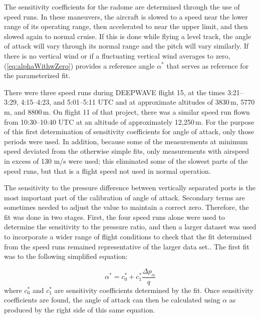 \documentclass[12pt,twoside,english]{article}\usepackage[]{graphicx}\usepackage[]{color}
\newenvironment{lyxcode}
{\par\begin{list}{}{
\setlength{\rightmargin}{\leftmargin}
\setlength{\listparindent}{0pt}%
\raggedright
\setlength{\itemsep}{0pt}
\setlength{\parsep}{0pt}
\normalfont\ttfamily}%
 \item[]}
{\end{list}}
\let\OrgIndex\index
\renewcommand*{\index}[1]{\OrgIndex{#1}}
\begin{document}
{{The sensitivity coefficients for the radome are determined through the use of speed runs. In these maneuvers, the aircraft is slowed to a speed near the lower range of its operating range, then accelerated to near the upper limit, and then slowed again to normal cruise. If this is done while flying a level track, the angle of attack will vary through its normal range and the pitch will vary similarly. If there is no vertical wind or if a fluctuating vertical wind averages to zero, (\ref{eq:alphaWithwZero}) provides a reference angle $\alpha^{*}$ that serves as reference for the parameterized fit. 

There were three speed runs during DEEPWAVE flight 15, at the times 3:21--3:29, 4:15--4:23, and 5:01--5:11 UTC and at approximate altitudes of 3830\,m, 5770\,m, and 8800\,m. On flight 11 of that project, there was a similar speed run flown from 10:30--10:40 UTC at an altitude of approximately 12,250\,m. For the purpose of this first determination of sensitivity coefficients for angle of attack, only those periods were used. In addition, because some of the measurements at minimum speed deviated from the otherwise simple fits, only measurements with airspeed in excess of 130 m/s were used; this eliminated some of the slowest parts of the speed runs, but that is a flight speed not used in normal operation. 


The sensitivity to the pressure difference between vertically separated ports is the most important part of the calibration of angle of attack. Secondary terms are sometimes needed to adjust the value to maintain a correct zero. Therefore, the fit was done in two stages. First, the four speed runs alone were used to determine the sensitivity to the pressure ratio, and then a larger dataset was used to incorporate a wider range of flight conditions to check that the fit determined from the speed runs remained representative of the larger data set.. The first fit was to the following simplified equation: 

\begin{equation}
\alpha^{*}=c_{0}^{*}+c_{1}^{*}\frac{\Delta p_{\alpha}}{q}\label{eq:AOAsens1term} 
\end{equation}
where $c_{0}^{*}$ and $c_{1}^{*}$ are sensitivity coefficients determined
by the fit. Once sensitivity coefficients are found, the angle of attack can then
be calculated using $\alpha$ as produced by the right side of this
same equation.

}}
\end{document}
